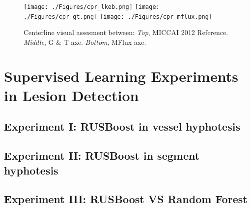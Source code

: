 \begin{figure}[htbp]
	\centering
		\texttt{[image: ./Figures/cpr\_lkeb.png]}
		\texttt{[image: ./Figures/cpr\_gt.png]}
		\texttt{[image: ./Figures/cpr\_mflux.png]}
	\caption[Centerline Comparison]{Centerline visual assesment between: \textit{Top}, MICCAI 2012 Reference. \textit{Middle}, G \& T axe. \textit{Bottom}, MFlux axe.}
	\label{fig:exp3_cpr}
\end{figure}

\section{Supervised Learning Experiments in Lesion Detection}

\subsection{Experiment I: RUSBoost in vessel hyphotesis}

\subsection{Experiment II: RUSBoost in segment hyphotesis}

\subsection{Experiment III: RUSBoost VS Random Forest}

